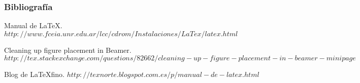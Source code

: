 \documentclass{beamer}
\begin{document}
\begin{frame}
  \frametitle{Bibliografía}

  \begin{thebibliography}{10}

    \beamertemplatebookbibitems
    Manual de \LaTeX. {\small $http://www.fceia.unr.edu.ar/lcc/cdrom/Instalaciones/LaTex/latex.html$}

    \beamertemplatebookbibitems
    Cleaning up figure placement in Beamer. {\small $http://tex.stackexchange.com/questions/82662/cleaning-up-figure-placement-in-beamer-minipage$}

    \beamertemplatebookbibitems
    Blog de \LaTeX fino. {\small $http://texnorte.blogspot.com.es/p/manual-de-latex.html$}

  \end{thebibliography}
\end{frame}


\end{document}
